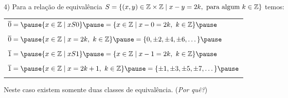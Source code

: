 \documentclass{beamer}
\begin{document}
    \begin{frame}
        \begin{exemplos}
            \begin{enumerate}
                \item[4)] Para a rela\c{c}\~ao de equival\^encia $S = \{(x,y)\in \mathbb{Z} \times \mathbb{Z} \mid x - y = 2k, \mbox{ para algum } k \in \mathbb{Z}\}$ temos:\pause
                \begin{center}
                    \begin{tabular}{l}
                        $\overline{0} = \pause \{x \in \z \mid xS0 \} \pause = \{x \in \z \mid x - 0 = 2k,\ k \in \z\} \pause$\\ \\
                        $\overline{0} = \pause \{x \in \z \mid x = 2k,\ k \in \z\} \pause = \{0, \pm 2, \pm 4, \pm 6, \dots\} \pause$\\ \\
                        $\overline{1} = \pause \{x \in \z \mid xS1 \} \pause = \{x \in \z \mid x - 1 = 2k,\ k \in \z\} \pause$\\ \\
                        $\overline{1} = \pause \{x \in \z \mid x = 2k + 1,\ k \in \z\} \pause = \{\pm 1, \pm 3, \pm 5, \pm 7, \dots\} \pause$\\ \\
                    \end{tabular}
                \end{center}
                Neste caso existem somente duas classes de equival\^encia. (\textit{Por qu\^e?})
            \end{enumerate}
        \end{exemplos}
    \end{frame}
\end{document}
